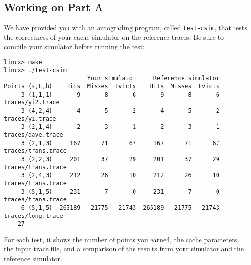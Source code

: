 \documentclass[11pt]{article}
\begin{document}
\subsection{Working on Part A}
We have provided you with an autograding program, called
\verb:test-csim:, that tests the correctness of your cache simulator
on the reference traces. Be sure to compile your simulator before
running the test:
{\small
\begin{verbatim}
linux> make
linux> ./test-csim
                        Your simulator     Reference simulator
Points (s,E,b)    Hits  Misses  Evicts    Hits  Misses  Evicts
     3 (1,1,1)       9       8       6       9       8       6  traces/yi2.trace
     3 (4,2,4)       4       5       2       4       5       2  traces/yi.trace
     3 (2,1,4)       2       3       1       2       3       1  traces/dave.trace
     3 (2,1,3)     167      71      67     167      71      67  traces/trans.trace
     3 (2,2,3)     201      37      29     201      37      29  traces/trans.trace
     3 (2,4,3)     212      26      10     212      26      10  traces/trans.trace
     3 (5,1,5)     231       7       0     231       7       0  traces/trans.trace
     6 (5,1,5)  265189   21775   21743  265189   21775   21743  traces/long.trace
    27
\end{verbatim}
} 

For each test, it shows the number of points you earned, the cache
parameters, the input trace file, and a comparison of the results from
your simulator and the reference simulator.
\end{document}
